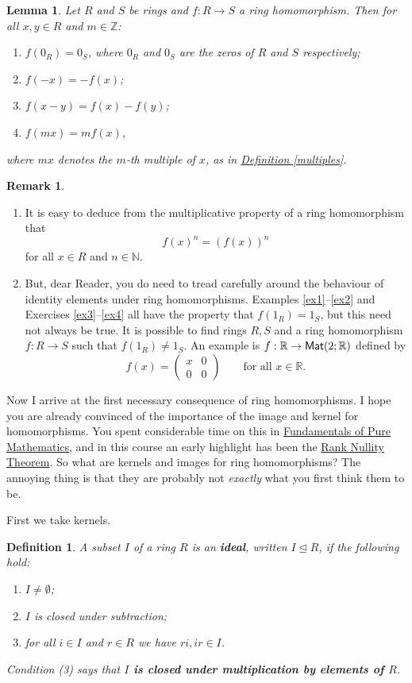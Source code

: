 \documentclass[11pt]{amsbook}
\newtheorem{definition}[theorem]{Definition}
\newtheorem{lemma}[theorem]{Lemma}
\theoremstyle{definition}
\newtheorem{rem}[theorem]{Remark}
\begin{document}
\begin{lemma} Let $R$ and $S$ be rings and $f: R \to S$ a ring homomorphism. Then for all $x,y\in R$ and $m\in \mathbb{Z}$:
\begin{enumerate}
\item $f (0_R) = 0_S$, where $0_R$ and $0_S$ are the zeros of $R$ and $S$ respectively;
\item $f (-x) = - f(x)$;
\item $f (x-y) = f(x) - f(y)$;
\item $f(mx) = m f (x)$,
\end{enumerate} where $mx$ denotes the $m$-th multiple of $x$, as in \hyperref[multiples]{Definition \ref{multiples}}.
\end{lemma}



\begin{rem}
\begin{enumerate}
\item It is easy to deduce from the multiplicative property of a ring homomorphism that $$f(x)^n = (f (x))^n$$ for all $x\in R$ and $n\in \mathbb{N}$.
\item But, dear Reader, you do need to tread carefully around the behaviour of identity elements under ring homomorphisms. Examples \ref{ex1}--\ref{ex2} and Exercises \ref{ex3}--\ref{ex4} all have the property that $f(1_R) = 1_S$, but this need not always be true. It is possible to find rings $R,S$ and a ring homomorphism $f : R\to S$ such that $f (1_R) \neq 1_S$. An example is $f : \mathbb{R} \to {\sf Mat}(2;\mathbb{R})$ defined by $$f (x) = \begin{pmatrix} x & 0 \\ 0 & 0 \end{pmatrix} \qquad \text{for all $x\in \mathbb{R}$}.$$
\end{enumerate}
\end{rem}

Now I arrive at the first necessary consequence of ring homomorphisms. I hope you are already convinced of the importance of the image and kernel for homomorphisms. You spent considerable time on this in  \href{http://www.drps.ed.ac.uk/12-13/dpt/cxmath08064.htm}{Fundamentals of Pure Mathematics}, and in this course an early highlight has been the \hyperref[rnthm]{Rank Nullity Theorem}. So what are kernels and images for ring homomorphisms? The annoying thing is that they are probably not {\it exactly} what you first think them to be.
\medskip

First we take kernels.
\begin{definition}
\label{defideal} A subset $I$ of a ring $R$ is an
\textbf{ideal}, written $I \unlhd R$, if the following hold:
\begin{enumerate}
\item $I\neq \emptyset$;
\item $I$ is closed under subtraction;
\item for all $i\in I$ and $r\in R$ we have $ri,ir \in I$.
\end{enumerate}
Condition (3) says that \textbf{$I$ is closed under
multiplication by elements of $R$}.
\end{definition}
\end{document}

